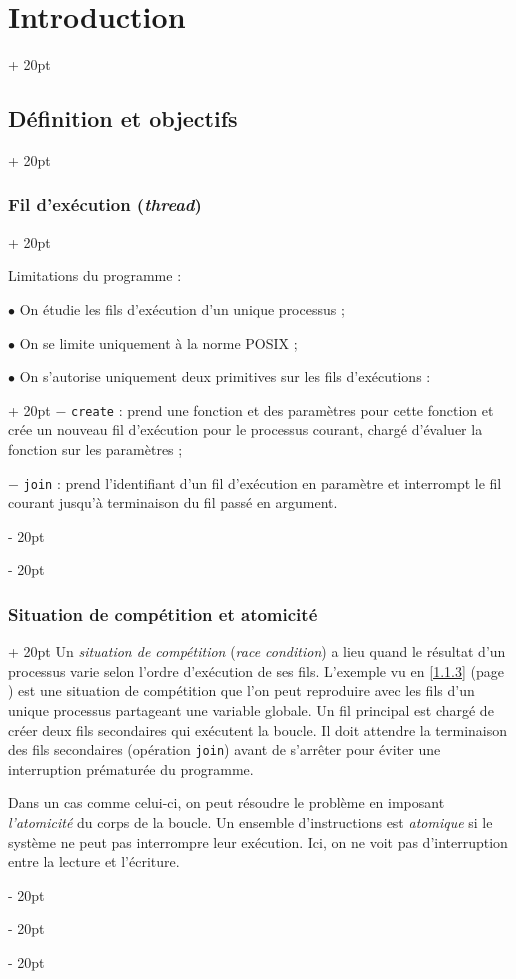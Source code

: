 \documentclass[a4paper, 12pt, twoside]{article}
\newcommand{\ind}[1][20pt]{\advance\leftskip + #1}
\newcommand{\deind}[1][20pt]{\advance\leftskip - #1}
\newenvironment{indt}[2][20pt]{#2 \par \ind[#1]}{\par \deind} %
\begin{document}
\begin{indt}{\section{Introduction}}
\begin{indt}{\subsection{Définition et objectifs}}
\begin{indt}{\subsubsection{Fil d'exécution (\textit{thread})}}
                \vspace{12pt}
                
                Limitations du programme :

                $\bullet$ On étudie les fils d'exécution d'un unique processus ;

                $\bullet$ On se limite uniquement à la norme POSIX ;

                \begin{indt}{$\bullet$ On s'autorise uniquement deux primitives sur les fils d'exécutions :}
                    $-$ \texttt{create} : prend une fonction et des paramètres pour cette fonction et crée un nouveau fil d'exécution pour le processus courant, chargé d'évaluer la fonction sur les paramètres ;

                    $-$ \texttt{join} : prend l'identifiant d'un fil d'exécution en paramètre et interrompt le fil courant jusqu'à terminaison du fil passé en argument.
                \end{indt}
            \end{indt}

            \vspace{12pt}
            
            \begin{indt}{\subsubsection{Situation de compétition et atomicité}}
                Un \textit{situation de compétition} (\textit{race condition}) a lieu quand le résultat d'un processus varie selon l'ordre d'exécution de ses fils. L'exemple vu en \ref{1.1.3} (page \pageref{1.1.3}) est une situation de compétition que l'on peut reproduire avec les fils d'un unique processus partageant une variable globale.
                Un fil principal est chargé de créer deux fils secondaires qui exécutent la boucle.
                Il doit attendre la terminaison des fils secondaires (opération \texttt{join}) avant de s'arrêter pour éviter une interruption prématurée du programme.

                Dans un cas comme celui-ci, on peut résoudre le problème en imposant \textit{l'atomicité} du corps de la boucle. Un ensemble d'instructions est \textit{atomique} si le système ne peut pas interrompre leur exécution. Ici, on ne voit pas d'interruption entre la lecture et l'écriture.
            \end{indt}


\end{indt}
\end{indt}
\end{document}
